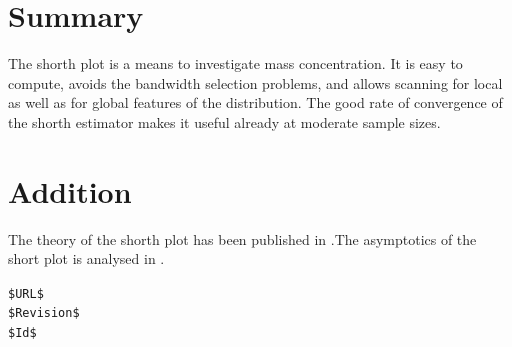\documentclass[dvips,12pt,a4paper,twoside]{amsart}
\begin{document}
\section{Summary}
The shorth plot is a means to investigate mass concentration. 
It is easy to compute, avoids the bandwidth selection problems, and allows scanning for local as well
as for global features of the distribution. The good rate of convergence of the shorth estimator makes it useful already at moderate sample sizes.

\section{Addition}
The theory of the shorth plot has been published in \cite{egs2010shorthplot}.The asymptotics of the short plot is analysed in \cite{egs2010shorthasymptotics}.

%

%
%
%


\ifx\private\undefined%
\else
\printindex
\fi

\ifx\private\undefined%
\else
\noindent
{\tiny%
\verb|$URL$|\\
\verb+$Revision$+\\
\verb+$Id$+
}
\fi
\end{document}
